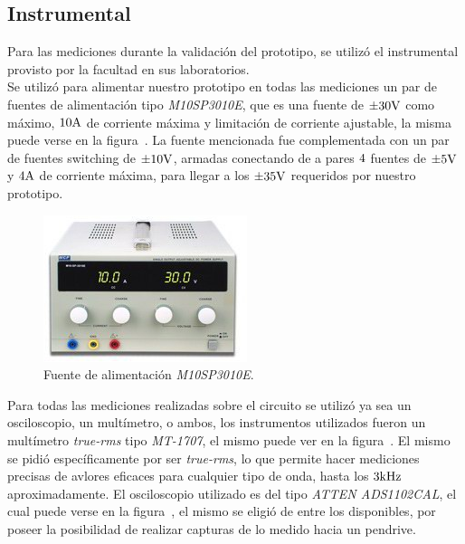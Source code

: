 \subsection{Instrumental}

\label{sec:instrumentos}

Para las mediciones durante la validación del prototipo, se utilizó el instrumental provisto por la facultad en sus laboratorios. \\

Se utilizó para alimentar nuestro prototipo en todas las mediciones un par de fuentes de alimentación tipo \textit{M10SP3010E}, que es una fuente de $\pm 30 \si[per-mode=symbol]{\volt}$ como máximo, $10 \si[per-mode=symbol]{\ampere}$ de corriente máxima y limitación de corriente ajustable, la misma puede verse en la figura~. La fuente mencionada fue complementada con un par de fuentes switching de $\pm 10 \si[per-mode=symbol]{\volt}$, armadas conectando de a pares $\num 4$ fuentes de $\pm 5 \si[per-mode=symbol]{\volt}$ y $4 \si[per-mode=symbol]{\ampere}$ de corriente máxima, para llegar a los $\pm 35 \si[per-mode=symbol]{\volt}$ requeridos por nuestro prototipo.


\begin{figure}[H]
    \centering
    \includegraphics[width=0.5 \textwidth]{./img/instrumentos/M10SP3010E.png}
    \caption{Fuente de alimentación \textit{M10SP3010E}.}
    \label{fig:power_supply_lab}
\end{figure}



Para todas las mediciones realizadas sobre el circuito se utilizó ya sea un osciloscopio, un multímetro, o ambos, los instrumentos utilizados fueron un multímetro \textit{true-rms} tipo \textit{MT-1707}, el mismo puede ver en la figura~. El mismo se pidió específicamente por ser \textit{true-rms}, lo que permite hacer mediciones precisas de avlores eficaces para cualquier tipo de onda, hasta los $3 \si[per-mode=symbol]{\kilo\hertz}$ aproximadamente. El osciloscopio utilizado es del tipo \textit{ATTEN ADS1102CAL}, el cual puede verse en la figura~, el mismo se eligió de entre los disponibles, por poseer la posibilidad de realizar capturas de lo medido hacia un pendrive.


